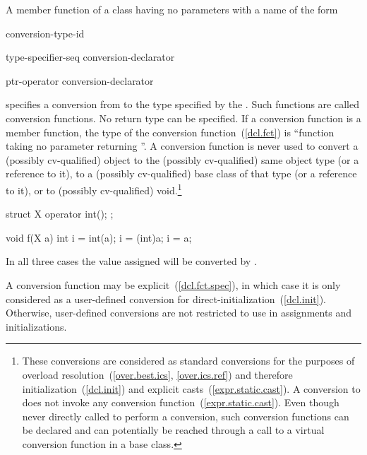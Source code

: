 \pnum
A member function of a class  having no parameters with a name of the form

\begin{bnf}
\br
     conversion-type-id
\end{bnf}

\begin{bnf}
\br
    type-specifier-seq conversion-declarator\opt
\end{bnf}

\begin{bnf}
\br
    ptr-operator conversion-declarator\opt
\end{bnf}

specifies a conversion from
to the type specified by the
.
Such functions are called conversion functions.
No return type can be specified.
%
If a conversion function is a member function, the type of the conversion function~(\ref{dcl.fct}) is
``function taking no parameter returning
''.
A conversion function is never used to convert a (possibly cv-qualified) object
to the (possibly cv-qualified) same object type (or a reference to it),
to a (possibly cv-qualified) base class of that type (or a reference to it),
or to (possibly cv-qualified) void.\footnote{These conversions are considered
as standard conversions for the purposes of overload resolution~(\ref{over.best.ics}, \ref{over.ics.ref}) and therefore initialization~(\ref{dcl.init}) and explicit casts~(\ref{expr.static.cast}). A conversion to  does not invoke any conversion function~(\ref{expr.static.cast}).
Even though never directly called to perform a conversion,
such conversion functions can be declared and can potentially
be reached through a call to a virtual conversion function in a base class.}

\enterexample

\begin{codeblock}
struct X {
  operator int();
};

void f(X a) {
  int i = int(a);
  i = (int)a;
  i = a;
}
\end{codeblock}

In all three cases the value assigned will be converted by
.
\exitexample

\pnum
A conversion function may be explicit~(\ref{dcl.fct.spec}), in which case it is only considered as a user-defined conversion for direct-initialization~(\ref{dcl.init}). Otherwise, user-defined conversions are not restricted to use in assignments and initializations.
\enterexample

